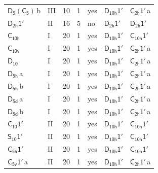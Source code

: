 \documentclass[10pt,a4paper]{article}
\numberwithin{equation}{section}
\newcommand{\grp}[1]{\mathsf{#1}}
\newcommand{\clsletter}[1]{\,{\scriptsize\color{black!55}#1}}
\begin{document}
{\begin{longtable}{@{}llrrlll@{}}
\href{D5-C5.pdf}{$\grp{D_{5}}(\grp{C_{5}})$}\clsletter{b} & III & 10 & 1 & yes & \href{D10h-1p.pdf}{$\grp{D_{10h}1'}$} & \href{C2h-1p.pdf}{$\grp{C_{2h}1'}$}\clsletter{a}\\
\href{D2h-1p.pdf}{$\grp{D_{2h}1'}$} & II & 16 & 5 & no & \href{D2h-1p.pdf}{$\grp{D_{2h}1'}$} & \href{D2h-1p.pdf}{$\grp{D_{2h}1'}$}\\
\href{../../../rotation/data/pdf/C10h.pdf}{$\grp{C_{10h}}$} & I & 20 & 1 & yes & \href{D10h-1p.pdf}{$\grp{D_{10h}1'}$} & \href{C10h-1p.pdf}{$\grp{C_{10h}1'}$}\\
\href{../../../rotation/data/pdf/C10v.pdf}{$\grp{C_{10v}}$} & I & 20 & 1 & yes & \href{D10h-1p.pdf}{$\grp{D_{10h}1'}$} & \href{C2h-1p.pdf}{$\grp{C_{2h}1'}$}\clsletter{a}\\
\href{../../../rotation/data/pdf/D10.pdf}{$\grp{D_{10}}$} & I & 20 & 1 & yes & \href{D10h-1p.pdf}{$\grp{D_{10h}1'}$} & \href{C2h-1p.pdf}{$\grp{C_{2h}1'}$}\clsletter{a}\\
\href{../../../rotation/data/pdf/D5h.pdf}{$\grp{D_{5h}}$}\clsletter{a} & I & 20 & 1 & yes & \href{D10h-1p.pdf}{$\grp{D_{10h}1'}$} & \href{C2h-1p.pdf}{$\grp{C_{2h}1'}$}\clsletter{a}\\
\href{../../../rotation/data/pdf/D5h.pdf}{$\grp{D_{5h}}$}\clsletter{b} & I & 20 & 1 & yes & \href{D10h-1p.pdf}{$\grp{D_{10h}1'}$} & \href{C2h-1p.pdf}{$\grp{C_{2h}1'}$}\clsletter{a}\\
\href{../../../rotation/data/pdf/D5d.pdf}{$\grp{D_{5d}}$}\clsletter{a} & I & 20 & 1 & yes & \href{D10h-1p.pdf}{$\grp{D_{10h}1'}$} & \href{C2h-1p.pdf}{$\grp{C_{2h}1'}$}\clsletter{a}\\
\href{../../../rotation/data/pdf/D5d.pdf}{$\grp{D_{5d}}$}\clsletter{b} & I & 20 & 1 & yes & \href{D10h-1p.pdf}{$\grp{D_{10h}1'}$} & \href{C2h-1p.pdf}{$\grp{C_{2h}1'}$}\clsletter{a}\\
\href{C10-1p.pdf}{$\grp{C_{10}1'}$} & II & 20 & 1 & yes & \href{D10h-1p.pdf}{$\grp{D_{10h}1'}$} & \href{C10h-1p.pdf}{$\grp{C_{10h}1'}$}\\
\href{S10-1p.pdf}{$\grp{S_{10}1'}$} & II & 20 & 1 & yes & \href{D10h-1p.pdf}{$\grp{D_{10h}1'}$} & \href{C10h-1p.pdf}{$\grp{C_{10h}1'}$}\\
\href{C5h-1p.pdf}{$\grp{C_{5h}1'}$} & II & 20 & 1 & yes & \href{D10h-1p.pdf}{$\grp{D_{10h}1'}$} & \href{C10h-1p.pdf}{$\grp{C_{10h}1'}$}\\
\href{C5v-1p.pdf}{$\grp{C_{5v}1'}$}\clsletter{a} & II & 20 & 1 & yes & \href{D10h-1p.pdf}{$\grp{D_{10h}1'}$} & \href{C2h-1p.pdf}{$\grp{C_{2h}1'}$}\clsletter{a}\\

\end{longtable}}
\end{document}
